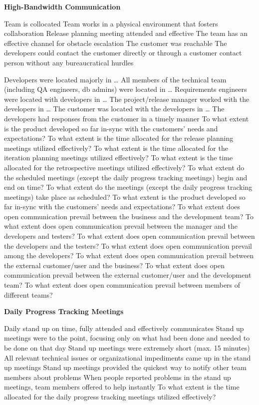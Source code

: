 \textbf{High-Bandwidth Communication}
\begin{itemize}
	\taa Team is collocated
	\taa Team works in a physical environment that fosters collaboration
	\taa Release planning meeting attended and effective
	\taar The team has an effective channel for obstacle escalation
	\pam The customer was reachable
	\pam The developers could contact the customer directly or through a customer contact person without any bureaucratical hurdles

	\pam Developers were located majorly in \ldots
	\pam All members of the technical team (including QA engineers, db admins) were located in \ldots
	\pam Requirements engineers were located with developers in \ldots
	\pam The project/release manager worked with the developers in \ldots
	\pam The customer was located with the developers in \ldots
	\pamr The developers had responses from the customer in a timely manner
	\ops To what extent is the product developed so far in-sync with the customers' needs and expectations?
	\ops To what extent is the time allocated for the release planning meetings utilized effectively?
	\ops To what extent is the time allocated for the iteration planning meetings utilized effectively?
	\ops To what extent is the time allocated for the retrospective meetings utilized effectively?
	\ops To what extent do the scheduled meetings (except the daily progress tracking meetings) begin and end on time?
	\ops To what extent do the meetings (except the daily progress tracking meetings) take place as scheduled? 
	\ops To what extent is the product developed so far in-sync with the customers' needs and expectations? 
	\ops To what extent does open communication prevail between the business and the development team? 
	\ops To what extent does open communication prevail between the manager and the developers and testers? 
	\ops To what extent does open communication prevail between the developers and the testers? 
	\ops To what extent does open communication prevail among the developers? 
	\ops To what extent does open communication prevail between the external customer/user and the business? 
	\ops To what extent does open communication prevail between the external customer/user and the development team?
	\ops To what extent does open communication prevail between members of different teams? 
\end{itemize}

\textbf{Daily Progress Tracking Meetings}
\begin{itemize}
	\taar Daily stand up on time, fully attended and effectively communicates
	\pam Stand up meetings were to the point, focusing only on what had been done and needed to be done on that day
	\pamr Stand up meetings were extremely short (max. 15 minutes)
	\pamr All relevant technical issues or organizational impediments came up in the stand up meetings
	\pamr Stand up meetings provided the quickest way to notify other team members about problems
	\pamr When people reported problems in the stand up meetings, team members offered to help instantly
	\ops To what extent is the time allocated for the daily progress tracking meetings utilized effectively?
\end{itemize}

